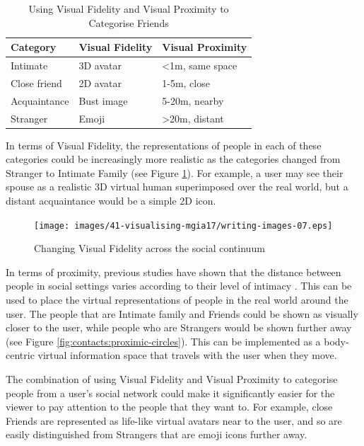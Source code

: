 \begin{table}[h]
    \centering
    \caption{Using Visual Fidelity and Visual Proximity to Categorise Friends}
    \label{tbl:visual-fidelity-proximity}
    \begin{tabular}{|l|l|l|}
        \hline
        \textbf{Category} & \textbf{Visual Fidelity}    & \textbf{Visual Proximity}       \\ \hline
        Intimate          & 3D avatar                     & \textless1m, same space  \\ \hline
        Close friend      & 2D avatar                   & 1-5m, close              \\ \hline
        Acquaintance      & Bust image                    & 5-20m, nearby            \\ \hline
        Stranger          & Emoji                        & \textgreater20m, distant \\ \hline
    \end{tabular}
\end{table}


In terms of Visual Fidelity, the representations of people in each of these categories could be increasingly more realistic as the categories changed from Stranger to Intimate Family (see Figure \ref{fig:contacts:visual-fidelity-continuum}). For example, a user may see their spouse as a realistic 3D virtual human superimposed over the real world, but a distant acquaintance would be a simple 2D icon.

\begin{figure}[h]
    \centering
    \texttt{[image: images/41-visualising-mgia17/writing-images-07.eps]}
    \caption{Changing Visual Fidelity across the social continuum}
    \label{fig:contacts:visual-fidelity-continuum}
\end{figure}

In terms of proximity, previous studies have shown that the distance between people in social settings varies according to their level of intimacy \cite{Anslow2016}. This can be used to place the virtual representations of people in the real world around the user. The people that are Intimate family and Friends could be shown as visually closer to the user, while people who are Strangers would be shown further away (see Figure \ref{fig:contacts:proximic-circles}). This can be implemented as a body-centric virtual information space that travels with the user when they move.

The combination of using Visual Fidelity and Visual Proximity to categorise people from a user's social network could make it significantly easier for the viewer to pay attention to the people that they want to. For example, close Friends are represented as life-like virtual avatars near to the user, and so are easily distinguished from Strangers that are emoji icons further away.


